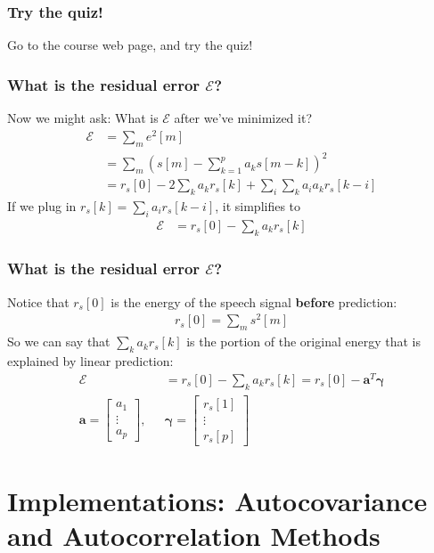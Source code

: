 \documentclass{beamer}
\begin{document}
\begin{frame}
  \frametitle{Try the quiz!}

  Go to the course web page, and try the quiz!
\end{frame}

\begin{frame}
  \frametitle{What is the residual error $\mathcal{E}$?}

  Now we might ask: What is $\mathcal{E}$ after we've
  minimized it?
  \begin{align*}
    \mathcal{E} &= \sum_me^2[m]\\
    &= \sum_m \left(s[m]-\sum_{k=1}^p a_k s[m-k]\right)^2\\
    &= r_s[0] - 2\sum_k a_kr_s[k] + \sum_i\sum_k a_ia_kr_s[k-i]
  \end{align*}
  If we plug in $r_s[k]=\sum_ia_ir_s[k-i]$, it simplifies to
  \begin{align*}
    \mathcal{E} &= r_s[0] - \sum_k a_kr_s[k]
  \end{align*}
\end{frame}

\begin{frame}
  \frametitle{What is the residual error $\mathcal{E}$?}

  Notice that $r_s[0]$ is the energy of the speech signal \textbf{before} prediction:
  \begin{align*}
    r_s[0] = \sum_m s^2[m]
  \end{align*}
  So we can say that $\sum_ka_kr_s[k]$ is the portion of the original energy that
  is explained by linear prediction:
  \begin{align*}
    \mathcal{E} &= r_s[0] - \sum_k a_kr_s[k] = r_s[0]-\mathbf{a}^T\boldsymbol{\gamma}\\
    \mathbf{a}=\left[\begin{array}{c}a_1\\\vdots\\a_p\end{array}\right],~~~
    &\boldsymbol{\gamma}=\left[\begin{array}{c}r_s[1]\\\vdots\\r_s[p]\end{array}\right]
  \end{align*}
    
\end{frame}

\section[Implementations]{Implementations: Autocovariance and Autocorrelation Methods}
\end{document}
